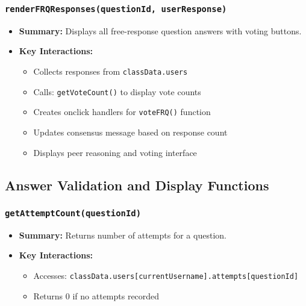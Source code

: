 \documentclass[11pt,letterpaper]{article}
\begin{document}
\subsubsection{\texttt{renderFRQResponses(questionId, userResponse)}}
\begin{itemize}
    \item \textbf{Summary:} Displays all free-response question answers with voting buttons.
    \item \textbf{Key Interactions:}
    \begin{itemize}
        \item Collects responses from \texttt{classData.users}
        \item Calls: \texttt{getVoteCount()} to display vote counts
        \item Creates onclick handlers for \texttt{voteFRQ()} function
        \item Updates consensus message based on response count
        \item Displays peer reasoning and voting interface
    \end{itemize}
\end{itemize}

\subsection{Answer Validation and Display Functions}

\subsubsection{\texttt{getAttemptCount(questionId)}}
\begin{itemize}
    \item \textbf{Summary:} Returns number of attempts for a question.
    \item \textbf{Key Interactions:}
    \begin{itemize}
        \item Accesses: \texttt{classData.users[currentUsername].attempts[questionId]}
        \item Returns 0 if no attempts recorded
    \end{itemize}
\end{itemize}
\end{document}
